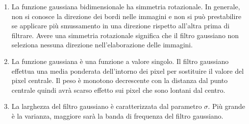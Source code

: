 \documentclass[../main.tex]{subfiles}
\begin{document}
\begin{enumerate}
	\itemsep0em
	\item La funzione gaussiana bidimensionale ha simmetria rotazionale. In generale, non si conosce la direzione dei bordi nelle immagini e non si può prestabilire se applicare più smussamento in una direzione rispetto all'altra prima di filtrare. Avere una simmetria rotazionale significa che il filtro gaussiano non seleziona nessuna direzione nell'elaborazione delle immagini.
	\item La funzione gaussiana è una funzione a valore singolo. Il filtro gaussiano effettua una media ponderata dell'intorno dei pixel per sostituire il valore del pixel centrale. Il peso è monotono decrescente con la distanza dal punto centrale quindi avrà scarso effetto sui pixel che sono lontani dal centro.
	\item La larghezza del filtro gaussiano è caratterizzata dal parametro $\sigma$. Più grande è la varianza, maggiore sarà la banda di frequenza del filtro gaussiano. \\[-10pt]
	

\end{enumerate}
\end{document}
